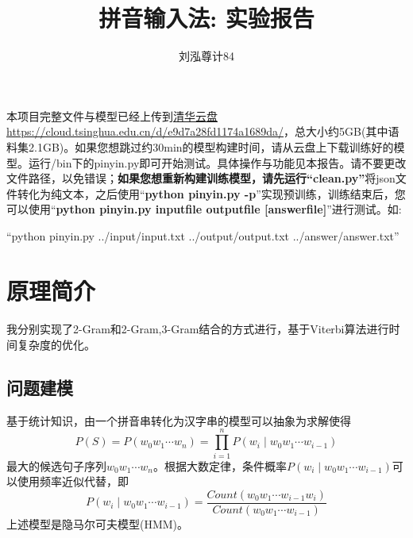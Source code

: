 \documentclass[UTF8, onecolumn, a4paper]{article}
\title{\textbf{拼音输入法: 实验报告}}%
\author{刘泓尊\quad 2018011446\quad 计84}
\date{}
\begin{document}
\maketitle
\tableofcontents
{}
\clearpage
本项目完整文件与模型已经上传到\href{https://cloud.tsinghua.edu.cn/d/e9d7a28fd1174a1689da/}{清华云盘 https://cloud.tsinghua.edu.cn/d/e9d7a28fd1174a1689da/}，总大小约5GB(其中语料集2.1GB)。如果您想跳过约30min的模型构建时间，请从云盘上下载训练好的模型。运行/bin下的pinyin.py即可开始测试。具体操作与功能见本报告。请不要更改文件路径，以免错误；\textbf{如果您想重新构建训练模型，请先运行“clean.py”}将json文件转化为纯文本，之后使用“\textbf{python pinyin.py -p}”实现预训练，训练结束后，您可以使用“\textbf{python pinyin.py inputfile outputfile [answerfile]}”进行测试。如:
\begin{center}
“python pinyin.py ../input/input.txt ../output/output.txt ../answer/answer.txt”  
\end{center}
                                                                           
\section{原理简介}
\paragraph*{}
我分别实现了2-Gram和2-Gram,3-Gram结合的方式进行，基于Viterbi算法进行时间复杂度的优化。
\subsection{问题建模}
基于统计知识，由一个拼音串转化为汉字串的模型可以抽象为求解使得
$$P(S) = P(w_0w_1\cdots w_n) = \prod_{i=1}^{n}P(w_i\mid w_0w_1\cdots w_{i-1})$$
最大的候选句子序列$w_0w_1\cdots w_n$。根据大数定律，条件概率$P(w_i\mid w_0w_1\cdots w_{i-1})$可以使用频率近似代替，即
$$P(w_i\mid w_0w_1\cdots w_{i-1}) = \frac{Count(w_0w_1\cdots w_{i-1}w_i)}{Count(w_0w_1\cdots w_{i-1})}$$
上述模型是隐马尔可夫模型(HMM)。
\end{document}
